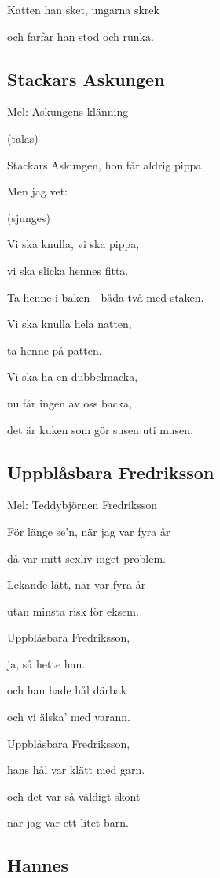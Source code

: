 Katten han sket, ungarna skrek

och farfar han stod och runka.

\subsection{\textbf{Stackars Askungen}}

Mel: Askungens klänning\bigskip


(talas)

Stackars Askungen, hon får aldrig pippa.

Men jag vet:

(sjunges)

Vi ska knulla, vi ska pippa,

vi ska slicka hennes fitta.

Ta henne i baken - båda två med staken.

Vi ska knulla hela natten,

ta henne på patten.

Vi ska ha en dubbelmacka,

nu får ingen av oss backa,

det är kuken som gör susen uti musen. 

\subsection{\textbf{Uppblåsbara Fredriksson}}

Mel: Teddybjörnen Fredriksson\bigskip


För länge se’n, när jag var fyra år

då var mitt sexliv inget problem.

Lekande lätt, när var fyra år

utan minsta risk för eksem.\bigskip


Uppblåsbara Fredriksson,

ja, så hette han.

och han hade hål därbak

och vi älska’ med varann.\bigskip


Uppblåsbara Fredriksson,

hans hål var klätt med garn.

och det var så väldigt skönt

när jag var ett litet barn. 

\subsection{\textbf{Hannes}}

